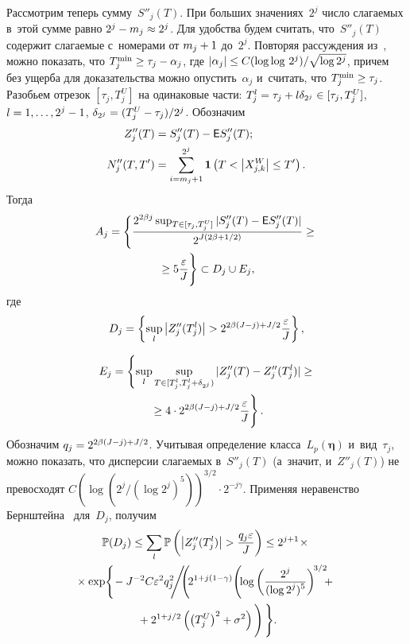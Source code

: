 \begin{multicols}{2}
Рассмотрим теперь сумму~$S''_{j}(T)$. При больших значениях~$2^j$ число 
слагаемых в~этой сумме равно $2^j\hm-m_j\hm\approx 2^j$. Для удобства будем считать, 
что~$S''_{j}(T)$ содержит слагаемые с~номерами от $m_j\hm+1$ до~$2^j$.
Повторяя рассуждения из~\cite{Jan01,KS16-1,KS16-2}, можно показать, что
$T_j^{\min}\hm\geq \tau_j\hm-\alpha_j$, где $\abs{\alpha_j}\hm\leq C 
({\log\log\,{2^j}})/{\sqrt{\log 2^j}}$, причем без ущерба для доказательства 
можно опус\-тить~$\alpha_j$ и~считать, что $T_j^{\min}\hm\geq \tau_j$. Разобьем 
отрезок $[\tau_j, T_{j}^U]$ на одинаковые части: 
$T_j^l\hm=\tau_j\hm+l\delta_{2^j}\hm \in [\tau_j, T_{j}^U]$, $l\hm=1,\ldots,2^j-1$, 
$\delta_{2^j}\hm=(T_{j}^U\hm-\tau_j)/2^j$. Обозначим
\begin{align*}
Z''_{j}(T)&=S''_{j}(T)-{\sf E} S''_{j}(T);\\
N''_{j}(T,T') &= \sum\limits_{i=m_j+1}^{2^j}\mathbf{1}\left(T < \left\vert X_{j,k}^W\right\vert  \leq T'\right).
\end{align*}
Тогда
\begin{multline*}
A_j=\Bigg\{\displaystyle\frac{\displaystyle 2^{2\beta j} \sup\nolimits_{T\in[\tau_j,T_{j}^U]} 
|S''_{j}(T)-{\sf E} S''_{j}(T)|\mathstrut}{\displaystyle 2^{J( 2\beta + 1/2)}\mathstrut} \geq{}\\
{}\geq  5 \displaystyle\frac{\displaystyle \varepsilon\mathstrut}{\displaystyle J\mathstrut} \Bigg\}\subset D_j\cup E_j,
\end{multline*}
где
$$
D_j=\left\{\sup\limits_{l}\left\vert Z''_{j}(T^l_j)\right\vert> 2^{2\beta (J - j) + J/2}  \displaystyle\frac{\displaystyle \varepsilon\mathstrut}{\displaystyle J\mathstrut} \right\},
$$

\vspace*{-12pt}

\noindent
\begin{multline*}
E_j = \left\{\sup\limits_{l} \sup\limits_{T\in[T^l_j,T^l_j + \delta_{2^j})} 
|Z''_{j}(T)-Z''_{j}(T^l_j)| \geq\right.\\
\left.{}\geq 4 \cdot 2^{2\beta (J - j) + J/2} 
\fr{\varepsilon}{J} 
\vphantom{\sup\limits_{T\in[T^l_j,T^l_j + \delta_{2^j})}}
\right\}.
\end{multline*}
Обозначим $q_j \hm= 2^{2\beta (J - j) + J/2}$. Учитывая определение класса~$L_p(\bm{\eta})$
и~вид~$\tau_j$, можно показать, что дисперсии слагаемых в~$S''_{j}(T)$ 
(а~значит, и~$Z''_{j}(T)$) не превосходят
$C\left(\log ({2^j}/\left(\log 2^j\right)^5)\right)^{3/2}\cdot 2^{-j\gamma}$. Применяя 
неравенство Бернштейна~\cite{B62} для~$D_j$, получим
\begin{multline*}
\mathbb{P}(D_j)\leq\sum\limits_l\mathbb{P}\left(\abs{Z''_{j}(T^l_j)}>\fr{q_j\varepsilon}{J}\right)\leq 2^{j+1}\!\times {}\\
{}\times \exp\!\Bigg\{\!-J^{-2} C \varepsilon^2  q_j^2 \!\!\Bigg/\!\!\!
\left(\!2^{1+j(1-\gamma)}\!\left(\!\log\left(\fr{2^{j}}{(\log 2^j)^5}\right)^{\!3/2}\!\!\!+{}\right.\right.\\
\left.{}+
2^{1+j/2}\left(\left(T_j^U\right)^2+\sigma^2\right)
\vphantom{\left(\fr{2^{j}}{(\log 2^j)^5}\right)^{\!3/2}}
\right)\Bigg\}.
\end{multline*}


\end{multicols}
